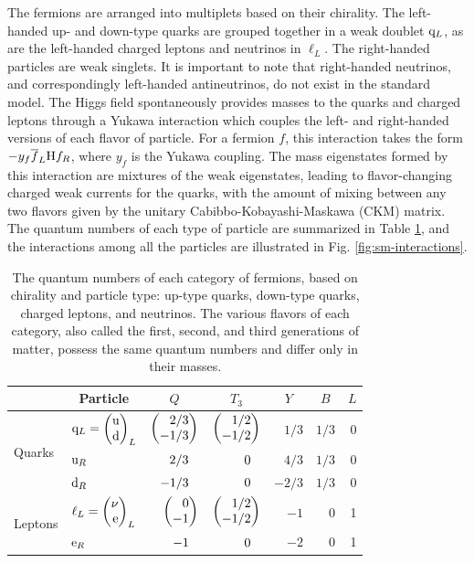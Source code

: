 The fermions are arranged into multiplets based on their chirality. The left-handed up- and down-type quarks are grouped together in a weak doublet $\mathrm{q}_L$, as are the left-handed charged leptons and neutrinos in $\ell_L$. The right-handed particles are weak singlets. It is important to note that right-handed neutrinos, and correspondingly left-handed antineutrinos, do not exist in the standard model. The Higgs field spontaneously provides masses to the quarks and charged leptons through a Yukawa interaction which couples the left- and right-handed versions of each flavor of particle. For a fermion $f$, this interaction takes the form $-y_{f} \overline{f}_{L} \mathrm{H} f_{R}$, where $y_{f}$ is the Yukawa coupling. The mass eigenstates formed by this interaction are mixtures of the weak eigenstates, leading to flavor-changing charged weak currents for the quarks, with the amount of mixing between any two flavors given by the unitary Cabibbo-Kobayashi-Maskawa (CKM) matrix. The quantum numbers of each type of particle are summarized in Table \ref{tab:q-num}, and the interactions among all the particles are illustrated in Fig. \ref{fig:sm-interactions}.

\begin{table}[htb]
  \begin{center}
    \begin{tabular}{|l||l|r|r|r|r|r|}
\hline
      & \multicolumn{1}{c|}{Particle} & \multicolumn{1}{c|}{$Q$} & \multicolumn{1}{c|}{$T_3$} & \multicolumn{1}{c|}{$Y$} & \multicolumn{1}{c|}{$B$} & \multicolumn{1}{c|}{$L$} \\
\hline
\hline
\multirow{3}{*}{Quarks}  
\rule{0pt}{24pt}         & $\cPq_L = \doublet[r]{\cPqu}{\cPqd}_L$ & $\doublet[r]{2/3}{-1/3}$ & $\doublet[r]{1/2}{-1/2}$ & $1/3$  & $1/3$ & 0 \\
                         & $\mathrm{u}_R$                              & $2/3\hphantom{\bigg)}$   & $0\hphantom{\bigg)}$     & $4/3$  & $1/3$ & 0 \\
                         & $\mathrm{d}_R$                              & $-1/3\hphantom{\bigg)}$  & $0\hphantom{\bigg)}$     & $-2/3$ & $1/3$ & 0 \\
\hline
\hline
\multirow{2}{*}{Leptons} 
\rule{0pt}{24pt}         & $\ell_L = \doublet[r]{\nu}{\Pe}_L$     & $\doublet[r]{0}{-1}$     & $\doublet[r]{1/2}{-1/2}$ & $-1$   & 0     & 1 \\
                         & $\mathrm{e}_R$                                & $-1\hphantom{\bigg)}$    & $0\hphantom{\bigg)}$     & $-2$   & 0     & 1 \\
\hline
    \end{tabular}
    \caption{The quantum numbers of each category of fermions, based on chirality and particle type: up-type quarks, down-type quarks, charged leptons, and neutrinos. The various flavors of each category, also called the first, second, and third generations of matter, possess the same quantum numbers and differ only in their masses.}
    \label{tab:q-num}
  \end{center}
\end{table}

